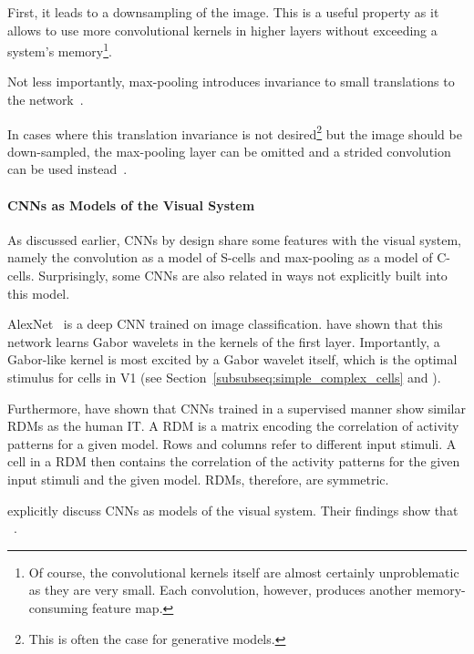 First, it leads to a downsampling of the image.
This is a useful property as it allows to use more convolutional kernels in higher layers without exceeding a system's memory\footnote{Of course, the convolutional kernels itself are almost certainly unproblematic as they are very small. Each convolution, however, produces another memory-consuming feature map.}.

Not less importantly, max-pooling introduces invariance to small translations to the network~\citep[p. 342]{Goodfellow-et-al-2016}.

In cases where this translation invariance is not desired\footnote{This is often the case for generative models.} but the image should be down-sampled, the max-pooling layer can be omitted and a strided convolution can be used instead~\citep[p. 337]{Goodfellow-et-al-2016}.

\paragraph{\acp{CNN} as Models of the Visual System}
As discussed earlier, \acp{CNN} by design share some features with the visual system, namely the convolution as a model of S-cells and max-pooling as a model of C-cells.
Surprisingly, some \acp{CNN} are also related in ways not explicitly built into this model.

AlexNet~\citep{krizhevsky2012imagenet} is a deep \ac{CNN} trained on image classification.
\citet{krizhevsky2012imagenet} have shown that this network learns Gabor wavelets in the kernels of the first layer.
Importantly, a Gabor-like kernel is most excited by a Gabor wavelet itself, which is the optimal stimulus for cells in \ac{V1} (see Section~\ref{subsubseq:simple_complex_cells} and \citet{jones1987evaluation}).

Furthermore, \citet{khaligh2014deep} have shown that \acp{CNN} trained in a supervised manner show similar \acp{RDM} as the human \ac{IT}.
A \ac{RDM} is a matrix encoding the correlation of activity patterns for a given model.
Rows and columns refer to different input stimuli.
A cell in a \ac{RDM} then contains the correlation of the activity patterns for the given input stimuli and the given model.
\acp{RDM}, therefore, are symmetric.

\citet{eickenberg2017seeing} explicitly discuss \acp{CNN} as models of the visual system.
Their findings show that ~\citep{eickenberg2017seeing, wen2018neural}.


